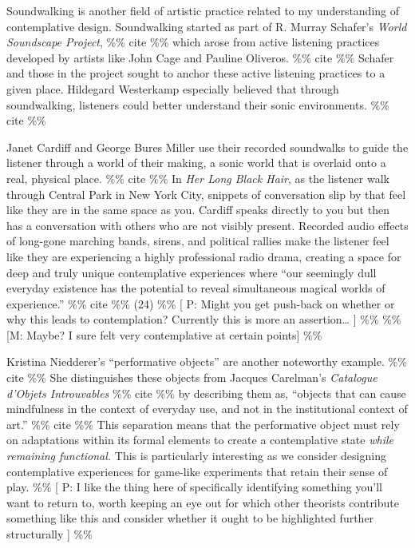 \documentclass[
]{article}
\begin{document}
Soundwalking is another field of artistic practice related to my
understanding of contemplative design. Soundwalking started as part of
R. Murray Schafer's \emph{World Soundscape Project}, \%\% cite \%\%
which arose from active listening practices developed by artists like
John Cage and Pauline Oliveros. \%\% cite \%\% Schafer and those in the
project sought to anchor these active listening practices to a given
place. Hildegard Westerkamp especially believed that through
soundwalking, listeners could better understand their sonic
environments. \%\% cite \%\%

Janet Cardiff and George Bures Miller use their recorded soundwalks to
guide the listener through a world of their making, a sonic world that
is overlaid onto a real, physical place. \%\% cite \%\% In \emph{Her
Long Black Hair}, as the listener walk through Central Park in New York
City, snippets of conversation slip by that feel like they are in the
same space as you. Cardiff speaks directly to you but then has a
conversation with others who are not visibly present. Recorded audio
effects of long-gone marching bands, sirens, and political rallies make
the listener feel like they are experiencing a highly professional radio
drama, creating a space for deep and truly unique contemplative
experiences where ``our seemingly dull everyday existence has the
potential to reveal simultaneous magical worlds of experience.'' \%\%
cite \%\% (24) \%\% {[} P: Might you get push-back on whether or why
this leads to contemplation? Currently this is more an assertion\ldots{}
{]} \%\% \%\% {[}M: Maybe? I sure felt very contemplative at certain
points{]} \%\%

Kristina Niedderer's ``performative objects'' are another noteworthy
example. \%\% cite \%\% She distinguishes these objects from Jacques
Carelman's \emph{Catalogue d'Objets Introuvables} \%\% cite \%\% by
describing them as, ``objects that can cause mindfulness in the context
of everyday use, and not in the institutional context of art.'' \%\%
cite \%\% This separation means that the performative object must rely
on adaptations within its formal elements to create a contemplative
state \emph{while remaining functional.} This is particularly
interesting as we consider designing contemplative experiences for
game-like experiments that retain their sense of play. \%\% {[} P: I
like the thing here of specifically identifying something you'll want to
return to, worth keeping an eye out for which other theorists contribute
something like this and consider whether it ought to be highlighted
further structurally {]} \%\%
\end{document}
